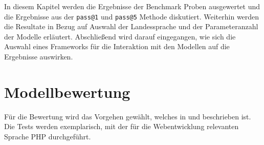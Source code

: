 In diesem Kapitel werden die Ergebnisse der Benchmark Proben ausgewertet und die Ergebnisse aus der \texttt{pass@1} und \texttt{pass@5} Methode diskutiert. Weiterhin werden die Resultate in Bezug auf Auswahl der Landessprache und der Parameteranzahl der Modelle erläutert. Abschließend wird darauf eingegangen, wie sich die Auswahl eines Frameworks für die Interaktion mit den Modellen auf die Ergebnisse auswirken.\vspace{0.2cm}






\section{Modellbewertung}
Für die Bewertung wird das Vorgehen gewählt, welches in \cite{chen-2021} und \cite{peng-2024} beschrieben ist. Die Tests werden exemplarisch, mit der für die Webentwicklung relevanten Sprache PHP durchgeführt. \vspace{0.2cm}

